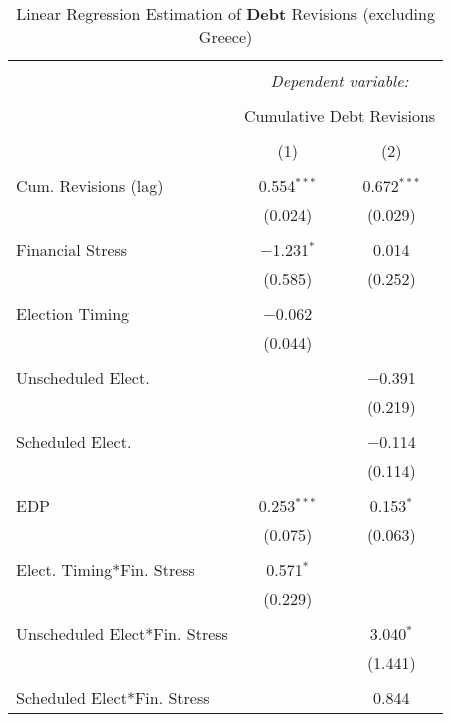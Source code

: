 
\begin{table}[!htbp] \centering 
  \caption{Linear Regression Estimation of \textbf{Debt} Revisions (excluding Greece)} 
  \label{debt_no_greece_results} 
\small 
\begin{tabular}{@{\extracolsep{5pt}}lcc} 
\\[-1.8ex]\hline 
\hline \\[-1.8ex] 
 & \multicolumn{2}{c}{\textit{Dependent variable:}} \\ 
\cline{2-3} 
\\[-1.8ex] & \multicolumn{2}{c}{Cumulative Debt Revisions} \\ 
\\[-1.8ex] & (1) & (2)\\ 
\hline \\[-1.8ex] 
 Cum. Revisions (lag) & 0.554$^{***}$ & 0.672$^{***}$ \\ 
  & (0.024) & (0.029) \\ 
  & & \\ 
 Financial Stress & $-$1.231$^{*}$ & 0.014 \\ 
  & (0.585) & (0.252) \\ 
  & & \\ 
 Election Timing & $-$0.062 &  \\ 
  & (0.044) &  \\ 
  & & \\ 
 Unscheduled Elect. &  & $-$0.391 \\ 
  &  & (0.219) \\ 
  & & \\ 
 Scheduled Elect. &  & $-$0.114 \\ 
  &  & (0.114) \\ 
  & & \\ 
 EDP & 0.253$^{***}$ & 0.153$^{*}$ \\ 
  & (0.075) & (0.063) \\ 
  & & \\ 
 Elect. Timing*Fin. Stress & 0.571$^{*}$ &  \\ 
  & (0.229) &  \\ 
  & & \\ 
 Unscheduled Elect*Fin. Stress &  & 3.040$^{*}$ \\ 
  &  & (1.441) \\ 
  & & \\ 
 Scheduled Elect*Fin. Stress &  & 0.844 \\ 

\end{tabular}
\end{table}
